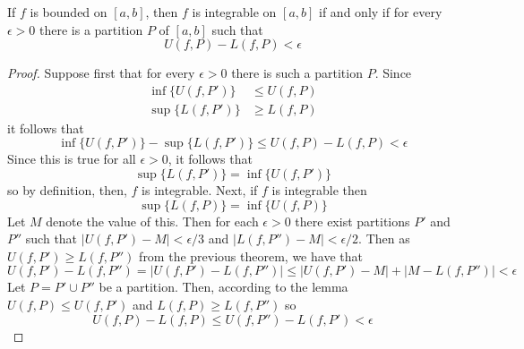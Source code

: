\documentclass[12pt, a4paper, oneside, openright, titlepage]{book}
\begin{document}
\begin{thm}
    If $f$ is bounded on $[a,b]$, then $f$ is integrable on $[a,b]$ if and only if for every $\epsilon > 0$ there is a partition $P$ of $[a,    b]$ such that $$U(f,P) - L(f,P) < \epsilon$$
\end{thm}
\begin{proof}
    Suppose first that for every $\epsilon > 0$ there is such a partition $P$. Since \begin{align*}
        \inf\{U(f,P')\} &\leq U(f,P) \\
        \sup\{L(f,P')\} &\geq L(f,P)
    \end{align*}
    it follows that \begin{equation*}
        \inf\{U(f,P')\} - \sup\{L(f,P')\} \leq U(f,P) - L(f,P) < \epsilon
    \end{equation*}
    Since this is true for all $\epsilon > 0$, it follows that \begin{equation*}
        \sup\{L(f,P')\} = \inf\{U(f,P')\}
    \end{equation*}
    so by definition, then, $f$ is integrable. Next, if $f$ is integrable then \begin{equation*}
        \sup\{L(f,P)\} = \inf\{U(f,P)\}
    \end{equation*}
    Let $M$ denote the value of this. Then for each $\epsilon > 0$ there exist partitions $P'$ and $P''$ such that $|U(f,P') - M| <\epsilon/    3$ and $|L(f,P'') - M| < \epsilon/2$. Then as $U(f,P') \geq L(f,P'')$ from the previous theorem, we have that \begin{equation*}
        U(f,P') - L(f,P'') = |U(f,P') - L(f,P'')| \leq |U(f,P') - M| + |M - L(f,P'')| < \epsilon
    \end{equation*}
    Let $P = P' \cup P''$ be a partition. Then, according to the lemma $U(f,P) \leq U(f,P')$ and $L(f,P) \geq L(f,P'')$ so \begin{equation*}
		U(f,P) - L(f,P) \leq U(f,P'') - L(f,P') <\epsilon
	\end{equation*}
\end{proof}
\end{document}
